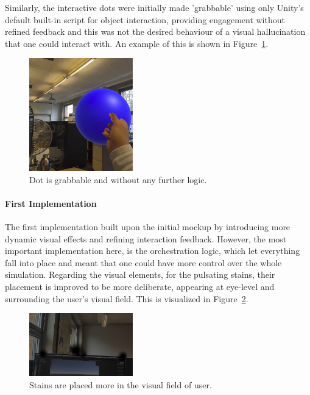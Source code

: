 Similarly, the interactive dots were initially made 'grabbable' using only Unity's default built-in script for object interaction, providing engagement without refined feedback and this was not the desired behaviour of a visual hallucination that one could interact with. An example of this is shown in Figure~\ref{fig:grabbing_dots}.

\begin{figure}[H]
    \centering
    \includegraphics[width=0.4\textwidth]{../../Figures/dot-grab.png}
    \caption{Dot is grabbable and without any further logic.}
    \label{fig:grabbing_dots}
\end{figure}

\paragraph{First Implementation}
The first implementation built upon the initial mockup by introducing more dynamic visual effects and refining interaction feedback. However, the most important implementation here, is the orchestration logic, which let everything fall into place and meant that one could have more control over the whole simulation. Regarding the visual elements, for the pulsating stains, their placement is improved to be more deliberate, appearing at eye-level and surrounding the user's visual field. This is visualized in Figure~\ref{fig:stains_placed}. 

\begin{figure}[H]
    \centering
    \includegraphics[width=0.4\textwidth]{../../Figures/stains-placed.png}
    \caption{Stains are placed more in the visual field of user.}
    \label{fig:stains_placed}
\end{figure}

